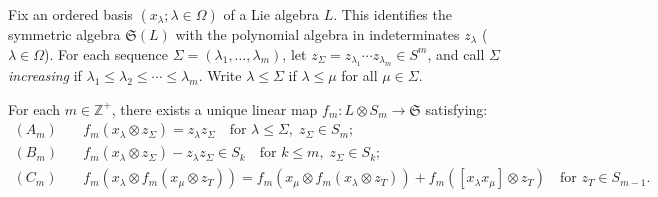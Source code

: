 Fix an ordered basis $(x_{\lambda}; \lambda \in \Omega)$ of a Lie algebra $L$. This identifies the symmetric algebra $\mathfrak{S}(L)$ with the polynomial algebra in indeterminates $z_{\lambda}$ ($\lambda \in \Omega$). For each sequence $\Sigma = (\lambda_1, \ldots, \lambda_m)$, let $z_{\Sigma} = z_{\lambda_1} \cdots z_{\lambda_m} \in S^m$, and call $\Sigma$ \textit{increasing} if $\lambda_1 \leq \lambda_2 \leq \cdots \leq \lambda_m$. Write $\lambda \leq \Sigma$ if $\lambda \leq \mu$ for all $\mu \in \Sigma$.

For each $m \in \mathbb{Z}^+$, there exists a unique linear map $f_m: L \otimes S_m \to \mathfrak{S}$ satisfying:
\begin{align*}
(A_m) &\quad f_m(x_{\lambda} \otimes z_{\Sigma}) = z_{\lambda} z_{\Sigma} \quad \text{for } \lambda \leq \Sigma,\; z_{\Sigma} \in S_m;\\
(B_m) &\quad f_m(x_{\lambda} \otimes z_{\Sigma}) - z_{\lambda} z_{\Sigma} \in S_k \quad \text{for } k \leq m,\; z_{\Sigma} \in S_k;\\
(C_m) &\quad f_m(x_{\lambda} \otimes f_m(x_{\mu} \otimes z_T)) = f_m(x_{\mu} \otimes f_m(x_{\lambda} \otimes z_T)) + f_m([x_{\lambda} x_{\mu}] \otimes z_T) \quad \text{for } z_T \in S_{m-1}.
\end{align*}
